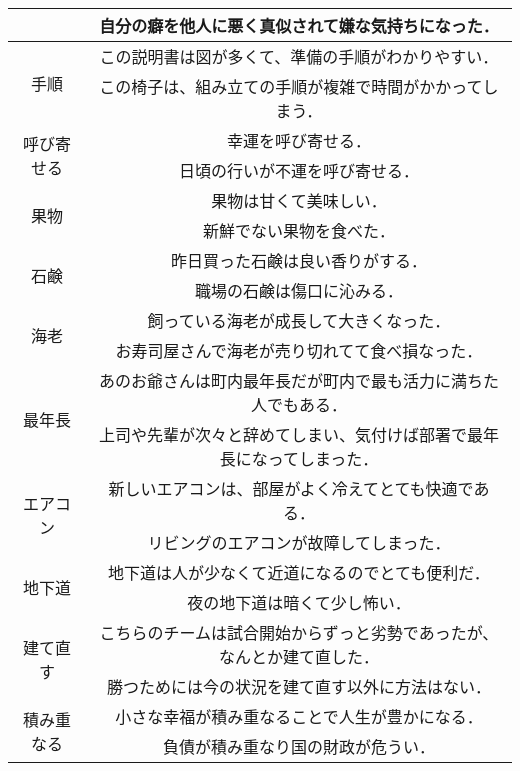\begin{longtable}[C]{|c|c|}
		\cline{2-2}
		& 自分の癖を他人に悪く真似されて嫌な気持ちになった．	\\
		\hline
		\multirow{2}{*}{手順} & この説明書は図が多くて、準備の手順がわかりやすい．	\\
		\cline{2-2}
		& この椅子は、組み立ての手順が複雑で時間がかかってしまう．	\\
		\hline
		\multirow{2}{*}{呼び寄せる} & 幸運を呼び寄せる．	\\
		\cline{2-2}
		& 日頃の行いが不運を呼び寄せる．	\\
		\hline
		\multirow{2}{*}{果物} & 果物は甘くて美味しい．	\\
		\cline{2-2}
		& 新鮮でない果物を食べた．	\\
		\hline
		\multirow{2}{*}{石鹸} & 昨日買った石鹸は良い香りがする．	\\
		\cline{2-2}
		& 職場の石鹸は傷口に沁みる．	\\
		\hline
		\multirow{2}{*}{海老} & 飼っている海老が成長して大きくなった．	\\
		\cline{2-2}
		& お寿司屋さんで海老が売り切れてて食べ損なった．	\\
		\hline
		\multirow{2}{*}{最年長} & あのお爺さんは町内最年長だが町内で最も活力に満ちた人でもある．	\\
		\cline{2-2}
		& 上司や先輩が次々と辞めてしまい、気付けば部署で最年長になってしまった．	\\
		\hline
		\multirow{2}{*}{エアコン} & 新しいエアコンは、部屋がよく冷えてとても快適である．	\\
		\cline{2-2}
		& リビングのエアコンが故障してしまった．	\\
		\hline
		\multirow{2}{*}{地下道} & 地下道は人が少なくて近道になるのでとても便利だ．	\\
		\cline{2-2}
		& 夜の地下道は暗くて少し怖い．	\\
		\hline
		\multirow{2}{*}{建て直す} & こちらのチームは試合開始からずっと劣勢であったが、なんとか建て直した．	\\
		\cline{2-2}
		& 勝つためには今の状況を建て直す以外に方法はない．	\\
		\hline
		\multirow{2}{*}{積み重なる} & 小さな幸福が積み重なることで人生が豊かになる．	\\
		\cline{2-2}
		& 負債が積み重なり国の財政が危うい．	\\
		\hline		
\end{longtable}